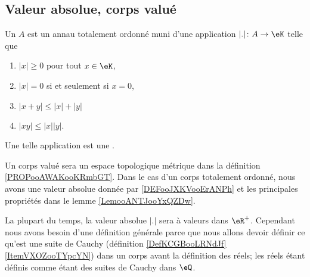\subsection{Valeur absolue, corps valué}
\label{SUBooValAbsCorpsValue}

\begin{definition}       \label{DEFooBWXXooAkBBRS}
	Un  \( A\) est un annau totalement ordonné muni d'une application \( | . |\colon A\to \eK\) telle que
	\begin{enumerate}
		\item
		      \( | x |\geq 0\) pour tout \( x\in \eK\),
		\item
		      \( | x |=0\) si et seulement si \( x=0\),
		\item
		      \( | x+y |\leq | x |+| y |\)
		\item
		      \( | xy |\leq | x | | y |\).
	\end{enumerate}
	Une telle application est une .
\end{definition}

\begin{normaltext}\label{NORooLienCorpsValueEspaceMetrique}
	Un corps valué sera un espace topologique métrique dans la définition \ref{PROPooAWAKooKRmbGT}. Dans le cas d'un corps totalement ordonné, nous avons une valeur absolue donnée par \ref{DEFooJXKVooErANPh} et les principales propriétés dans le lemme \ref{LemooANTJooYxQZDw}.
\end{normaltext}

\begin{normaltext}\label{NORooValAbsGenerale}
	La plupart du temps, la valeur absolue \( | . |\) sera à valeurs dans \( \eR^+\). Cependant nous avons besoin d'une définition générale parce que nous allons devoir définir ce qu'est une suite de Cauchy (définition \ref{DefKCGBooLRNdJf}\ref{ItemVXOZooTYpcYN}) dans un corps avant la définition des réels; les réels étant définis comme étant des suites de Cauchy dans \( \eQ\).
\end{normaltext}


